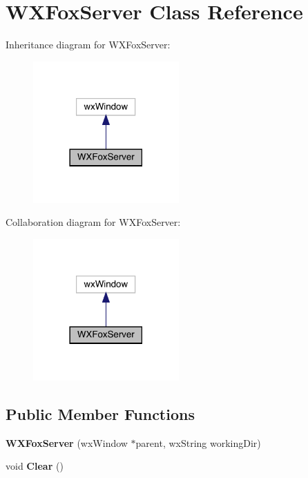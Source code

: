 \hypertarget{class_w_x_fox_server}{}\section{W\+X\+Fox\+Server Class Reference}
\label{class_w_x_fox_server}


Inheritance diagram for W\+X\+Fox\+Server\+:
\nopagebreak
\begin{figure}[H]
\begin{center}
\leavevmode
\includegraphics[width=158pt]{class_w_x_fox_server__inherit__graph}
\end{center}
\end{figure}


Collaboration diagram for W\+X\+Fox\+Server\+:
\nopagebreak
\begin{figure}[H]
\begin{center}
\leavevmode
\includegraphics[width=158pt]{class_w_x_fox_server__coll__graph}
\end{center}
\end{figure}
\subsection*{Public Member Functions}
\begin{DoxyCompactItemize}
\item 
\mbox{\label{class_w_x_fox_server_a8da5eb3b81c8525af80610c827cda405}} 
{\bfseries W\+X\+Fox\+Server} (wx\+Window $\ast$parent, wx\+String working\+Dir)
\item 
\mbox{\label{class_w_x_fox_server_aedf8904c8f380d8620a2505362133939}} 
void {\bfseries Clear} ()
\end{DoxyCompactItemize}
